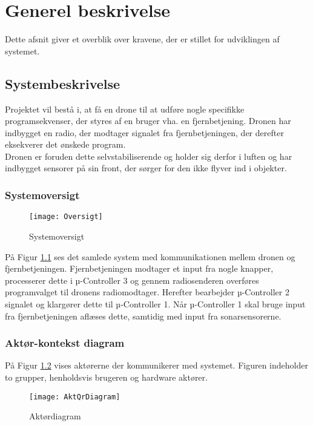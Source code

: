 \documentclass[Main]{subfiles}
\begin{document}
\chapter{Generel beskrivelse}
Dette afsnit giver et overblik over kravene, der er stillet for udviklingen af systemet.

\section{Systembeskrivelse}
Projektet vil bestå i, at få en drone til at udføre nogle specifikke programsekvenser, der styres af en bruger vha. en fjernbetjening.
Dronen har indbygget en radio, der modtager signalet fra fjernbetjeningen, der derefter eksekverer det ønskede program.
\\
Dronen er foruden dette selvstabiliserende og holder sig derfor i luften og har indbygget sensorer på sin front, der sørger for den ikke flyver ind i objekter.


\subsection{Systemoversigt}

\begin{figure}[H]
\centering
\texttt{[image: Oversigt]}
\caption{Systemoversigt}
\label{Fig:Oversigt}
\end{figure}

På Figur \ref{Fig:Oversigt} ses det samlede system med kommunikationen mellem dronen og fjernbetjeningen.
Fjernbetjeningen modtager et input fra nogle knapper, processerer dette i µ-Controller 3 og gennem radiosenderen overføres programvalget til dronens radiomodtager.
Herefter bearbejder µ-Controller 2 signalet og klargører dette til µ-Controller 1.
Når µ-Controller 1 skal bruge input fra fjernbetjeningen aflæses dette, samtidig med input fra sonarsensorerne.



\subsection{Aktør-kontekst diagram}

På Figur \ref{Fig:Aktor-oversigt} vises aktørerne der kommunikerer med systemet.
Figuren indeholder to grupper, henholdsvis brugeren og hardware aktører.


\begin{figure}[H]
\centering
\texttt{[image: AktQrDiagram]}
\caption{Aktørdiagram}
\label{Fig:Aktor-oversigt}
\end{figure}
\end{document}
